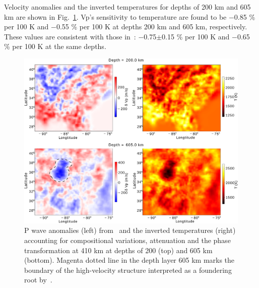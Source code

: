 \documentclass[draft,linenumbers]{agujournal2018}
\begin{document}
Velocity anomalies and the inverted temperatures for depths of 200 km and 605 km are shown in Fig.~\ref{fig_temp}. 
Vp's sensitivity to temperature are found to be $-$0.85 \% per 100 K and $-$0.55 \% per 100 K at depths 200 km and 605 km, respectively. These values are consistent with those in~\citep{Cammarano2003}: $-$0.75$\pm$0.15 \% per 100 K and $-$0.65 \% per 100 K at the same depths. 
%
\begin{figure}[ht]
    \centering
    \includegraphics[width=0.75\linewidth]{figures/figure_temp.png}
    \caption{P wave anomalies (left) from~\citet{Biryol_2016} and the inverted temperatures (right) 
    accounting for compositional variations, attenuation and the phase transformation at 410 km  
    at depths of 200 (top) and 605 km (bottom). Magenta dotted line in the depth layer 605 km marks the boundary of the high-velocity structure interpreted as a foundering root by~\citet{Biryol_2016}.
    }
    \label{fig_temp}
 \end{figure}
\end{document}
